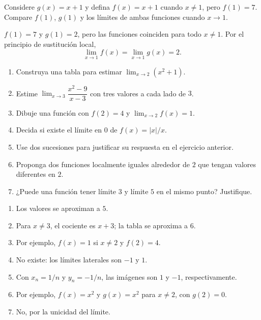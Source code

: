 \begin{ejemplo}
Considere $g(x)=x+1$ y defina $f(x)=x+1$ cuando $x\neq1$, pero $f(1)=7$. Compare $f(1)$, $g(1)$ y los límites de ambas funciones cuando $x\to1$.
\end{ejemplo}
\ifmostrarSoluciones
\begin{solucion}
$f(1)=7$ y $g(1)=2$, pero las funciones coinciden para todo $x\neq1$. Por el principio de sustitución local,
\[
\lim_{x\to1}f(x)=\lim_{x\to1}g(x)=2.
\]
\end{solucion}
\else\vspace{12mm}\fi

\begin{ejercicios}
\begin{enumerate}
  \item Construya una tabla para estimar $\lim_{x\to2}(x^2+1)$.
  \item Estime $\lim_{x\to3}\dfrac{x^2-9}{x-3}$ con tres valores a cada lado de $3$.
  \item Dibuje una función con $f(2)=4$ y $\lim_{x\to2}f(x)=1$.
  \item Decida si existe el límite en $0$ de $f(x)=|x|/x$.
  \item Use dos sucesiones para justificar su respuesta en el ejercicio anterior.
  \item Proponga dos funciones localmente iguales alrededor de $2$ que tengan valores diferentes en $2$.
  \item ¿Puede una función tener límite $3$ y límite $5$ en el mismo punto? Justifique.
\end{enumerate}
\end{ejercicios}

\ifmostrarSoluciones
\begin{solucion}
\begin{enumerate}
  \item Los valores se aproximan a $5$.
  \item Para $x\neq3$, el cociente es $x+3$; la tabla se aproxima a $6$.
  \item Por ejemplo, $f(x)=1$ si $x\neq2$ y $f(2)=4$.
  \item No existe: los límites laterales son $-1$ y $1$.
  \item Con $x_n=1/n$ y $y_n=-1/n$, las imágenes son $1$ y $-1$, respectivamente.
  \item Por ejemplo, $f(x)=x^2$ y $g(x)=x^2$ para $x\neq2$, con $g(2)=0$.
  \item No, por la unicidad del límite.
\end{enumerate}
\end{solucion}
\fi

\ifdefined\documentoSemanal
\else
{}

\fi
